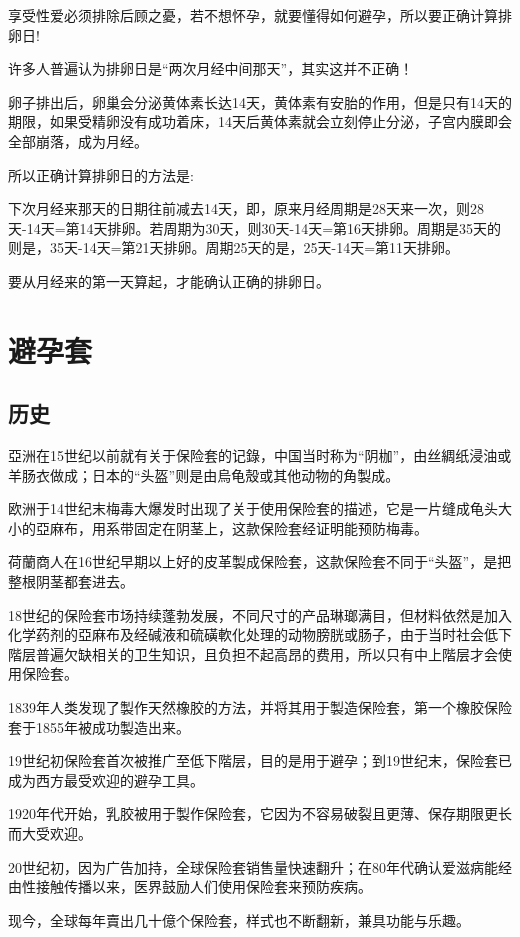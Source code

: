 \documentclass[12pt,UTF8]{ctexbook}
\begin{document}
享受性爱必须排除后顾之憂，若不想怀孕，就要懂得如何避孕，所以要正确计算排卵日!

许多人普遍认为排卵日是“两次月经中间那天”，其实这并不正确！

卵子排出后，卵巢会分泌黄体素长达14天，黄体素有安胎的作用，但是只有14天的期限，如果受精卵没有成功着床，14天后黄体素就会立刻停止分泌，子宫内膜即会全部崩落，成为月经。

所以正确计算排卵日的方法是:

下次月经来那天的日期往前减去14天，即，原来月经周期是28天来一次，则28天-14天=第14天排卵。若周期为30天，则30天-14天=第16天排卵。周期是35天的则是，35天-14天=第21天排卵。周期25天的是，25天-14天=第11天排卵。

要从月经来的第一天算起，才能确认正确的排卵日。

\section{避孕套}

\subsection{历史}

亞洲在15世纪以前就有关于保险套的记錄，中国当时称为“阴枷”，由丝綢纸浸油或羊肠衣做成；日本的“头盔”则是由烏龟殼或其他动物的角製成。

欧洲于14世纪末梅毒大爆发时出现了关于使用保险套的描述，它是一片缝成龟头大小的亞麻布，用系带固定在阴茎上，这款保险套经证明能预防梅毒。

荷蘭商人在16世纪早期以上好的皮革製成保险套，这款保险套不同于“头盔”，是把整根阴茎都套进去。

18世纪的保险套市场持续蓬勃发展，不同尺寸的产品琳瑯满目，但材料依然是加入化学药剂的亞麻布及经碱液和硫磺軟化处理的动物膀胱或肠子，由于当时社会低下階层普遍欠缺相关的卫生知识，且负担不起高昂的费用，所以只有中上階层才会使用保险套。

1839年人类发现了製作天然橡胶的方法，并将其用于製造保险套，第一个橡胶保险套于1855年被成功製造出来。

19世纪初保险套首次被推广至低下階层，目的是用于避孕；到19世纪末，保险套已成为西方最受欢迎的避孕工具。

1920年代开始，乳胶被用于製作保险套，它因为不容易破裂且更薄、保存期限更长而大受欢迎。

20世纪初，因为广告加持，全球保险套销售量快速翻升；在80年代确认爱滋病能经由性接触传播以来，医界鼓励人们使用保险套来预防疾病。

现今，全球每年賣出几十億个保险套，样式也不断翻新，兼具功能与乐趣。
\end{document}
